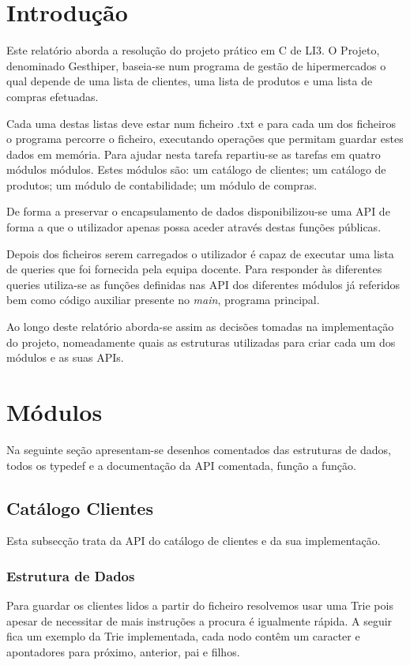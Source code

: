 \documentclass[10pt] {article}
\begin{document}
\section{Introdução}
\par Este relatório aborda a resolução do projeto prático em C de LI3. O Projeto, denominado Gesthiper, baseia-se
num programa de gestão de hipermercados o qual depende de uma lista de clientes, uma lista de produtos e uma
lista de compras efetuadas. \par Cada uma destas listas deve estar num ficheiro .txt e para cada um dos ficheiros o
programa percorre o ficheiro, executando operações que permitam guardar estes dados em memória. Para ajudar nesta tarefa repartiu-se as tarefas em quatro módulos
módulos. Estes módulos são: um catálogo de clientes; um catálogo de produtos; um módulo de contabilidade; um módulo de compras.
\par De forma a preservar o encapsulamento de dados disponibilizou-se uma API de
forma a que o utilizador apenas possa aceder através destas funções públicas.
\par Depois dos ficheiros serem carregados o utilizador é capaz de executar uma lista de queries que
foi fornecida pela equipa docente. Para responder às diferentes queries utiliza-se as funções definidas nas API dos diferentes
módulos já referidos bem como código auxiliar presente no \emph{main}, programa principal.
\par Ao longo deste relatório aborda-se assim as decisões tomadas na implementação do projeto, nomeadamente quais as estruturas utilizadas para criar cada um dos módulos e as suas APIs.

\newpage
\section{Módulos}
Na seguinte seção apresentam-se desenhos comentados das estruturas de dados,
todos os typedef e a documentação da API comentada, função a função.


\subsection{Catálogo Clientes}
\par Esta subsecção trata da API do catálogo de clientes e da sua implementação.

\subsubsection{Estrutura de Dados}
\par
Para guardar os clientes lidos a partir do ficheiro resolvemos usar uma Trie pois apesar de
necessitar de mais instruções a procura é igualmente rápida. A seguir fica um exemplo da Trie implementada,
cada nodo contêm um caracter e apontadores para próximo, anterior, pai e filhos.
\end{document}
